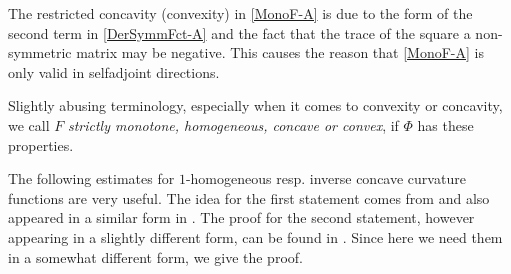 \begin{rem}The restricted concavity (convexity) in \eqref{MonoF-A} is due to the form of the second term in \eqref{DerSymmFct-A} and the fact that the trace of the square a non-symmetric matrix may be negative. This causes the reason that \eqref{MonoF-A} is only valid in selfadjoint directions.
\end{rem}

\begin{rem}
Slightly abusing terminology, especially when it comes to convexity or concavity, we call $F$ {\it{strictly monotone, homogeneous, concave or convex}}, if $\Phi$ has these properties.
\end{rem}

The following estimates for $1$-homogeneous resp. inverse concave curvature functions are very useful. The idea for the first statement comes from \cite[Thm.~2.3]{Andrews:/2007} and also appeared in a similar form in \cite[Lemma~14]{BIS1}. The proof for the second statement, however appearing in a slightly different form, can be found in \cite[p.~112]{Urbas:/1991}. Since here we need them in a somewhat different form, we give the proof.

{}

